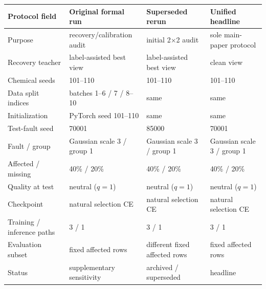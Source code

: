 \begin{tabular}{llll}
\toprule
Protocol field & Original formal run & Superseded rerun & Unified headline \\
\midrule
Purpose & recovery/calibration audit & initial 2$\times$2 audit & sole main-paper protocol \\
Recovery teacher & label-assisted best view & label-assisted best view & clean view \\
Chemical seeds & 101--110 & 101--110 & 101--110 \\
Data split indices & batches 1--6 / 7 / 8--10 & same & same \\
Initialization & PyTorch seed 101--110 & same & same \\
Test-fault seed & 70001 & 85000 & 70001 \\
Fault / group & Gaussian scale 3 / group 1 & Gaussian scale 3 / group 1 & Gaussian scale 3 / group 1 \\
Affected / missing & 40\% / 20\% & 40\% / 20\% & 40\% / 20\% \\
Quality at test & neutral ($q=1$) & neutral ($q=1$) & neutral ($q=1$) \\
Checkpoint & natural selection CE & natural selection CE & natural selection CE \\
Training / inference paths & 3 / 1 & 3 / 1 & 3 / 1 \\
Evaluation subset & fixed affected rows & different fixed affected rows & fixed affected rows \\
Status & supplementary sensitivity & archived / superseded & headline \\
\bottomrule
\end{tabular}